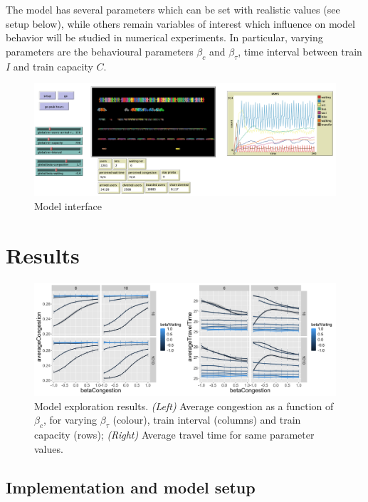 \documentclass[3p,times,procedia]{elsarticle}
\begin{document}
The model has several parameters which can be set with realistic values (see setup below), while others remain variables of interest which influence on model behavior will be studied in numerical experiments. In particular, varying parameters are the behavioural parameters $\beta_c$ and $\beta_{\tau}$, time interval between train $I$ and train capacity $C$.

\begin{figure}[t]\vspace*{4pt}
\centerline{\includegraphics[width=\linewidth]{figures/Fig2.png}}
\caption{Model interface}
\end{figure}

\section{Results}


\begin{figure}[t]\vspace*{4pt}
\centerline{\includegraphics[width=\linewidth]{figures/Fig3.png}}
\caption{Model exploration results. \textit{(Left)} Average congestion as a function of $\beta_c$, for varying $\beta_{\tau}$ (colour), train interval (columns) and train capacity (rows); \textit{(Right)} Average travel time for same parameter values.\label{fig:fig3}}
\end{figure}


\subsection{Implementation and model setup}
\end{document}

